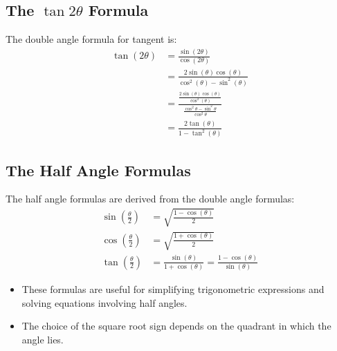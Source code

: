 \subsection{The $\tan 2\theta$ Formula}
The double angle formula for tangent is:
\begin{align}
    \tan(2\theta) &= \frac{\sin(2\theta)}{\cos(2\theta)} \\
    &= \frac{2\sin(\theta)\cos(\theta)}{\cos^2(\theta) - \sin^2(\theta)} \\
    &=\frac{\frac{2\sin(\theta)\cos(\theta)}{\cos^{2}(\theta)}}{\frac{\cos^{2}\theta - \sin^2\theta}{\cos^2 \theta}} \\
    &= \frac{2\tan(\theta)}{1 - \tan^2(\theta)}
\end{align}

\subsection{The Half Angle Formulas}
The half angle formulas are derived from the double angle formulas:
\begin{align}
    \sin\left(\frac{\theta}{2}\right) &= \sqrt{\frac{1 - \cos(\theta)}{2}} \\
    \cos\left(\frac{\theta}{2}\right) &= \sqrt{\frac{1 + \cos(\theta)}{2}} \\
    \tan\left(\frac{\theta}{2}\right) &= \frac{\sin(\theta)}{1 + \cos(\theta)} = \frac{1 - \cos(\theta)}{\sin(\theta)}
\end{align}
\begin{itemize}
    \item These formulas are useful for simplifying trigonometric expressions and solving equations involving half angles.
    \item The choice of the square root sign depends on the quadrant in which the angle lies.
\end{itemize}

